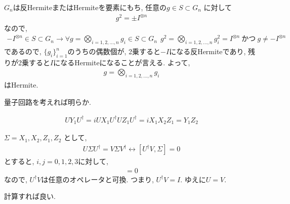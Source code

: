 \begin{ex}
    \label{ex10.35}
    $G_n$は反HermiteまたはHermiteを要素にもち,
    任意の$g \in S \subset G_n$
    に対して
    \begin{align*}
        g^2 = \pm I^{\otimes n}
    \end{align*}
    なので,
    \begin{align*}
        - I^{\otimes n} \in S \subset G_n
        \longrightarrow
        \forall g  = \bigotimes_{ i = 1, 2, ... , n} g_i \in S \subset G_n \ \
        g^2 = \bigotimes_{ i = 1, 2, ... , n} g_i^2 = I^{\otimes n} \ かつ \ g \neq  - I^{\otimes n}
    \end{align*}
    であるので, $\{g_i\}_{i=1}^n$のうちの偶数個が, 2乗すると$-I$になる反Hermiteであり, 残りが2乗すると$I$になるHermiteになることが言える. よって,
    \begin{align*}
        g  = \bigotimes_{ i = 1, 2, ... , n} g_i
    \end{align*}
    はHermite.
\end{ex}

\begin{ex}
    \label{ex10.36}
    量子回路を考えれば明らか.
\end{ex}

\begin{ex}
    \label{ex10.37}
    \begin{align*}
        UY_1 U^\dagger =
        i U X_1 U^\dagger U  Z_1 U^\dagger
        =
        i X_1 X_2 Z_1
        =
        Y_1 Z_2
    \end{align*}
\end{ex}

\begin{ex}
    \label{ex10.38}
    $\Sigma = X_1, X_2, Z_1, Z_2$
    として,
    \begin{align*}
        U \Sigma U^\dagger = V \Sigma V^\dagger
        \longleftrightarrow
        [ U^\dagger V,  \Sigma ] = 0
    \end{align*}
    とすると, $i, j = 0, 1,2,3$に対して,
    \begin{align*}
        [ U^\dagger V , \sigma_i \otimes \sigma_j ] = 0
    \end{align*}
    なので, $U^\dagger V$は任意のオペレータと可換. つまり, $U^\dagger V = I $. ゆえに$U = V$.
\end{ex}

\begin{ex}
    \label{ex10.39}
    計算すれば良い.
\end{ex}

